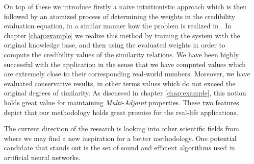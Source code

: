 \documentclass[egilmezThesis.tex]{subfiles}
\begin{document}
On top of these we introduce firstly a naive intuitionistic approach which is then followed by an atomized process of determining the weights in the credibility evaluation equation, in a similar manner how the problem is realized in \cite{MPS10}. In chapter \ref{chap:example} we realize this method by training the system with the original knowledge base, and then using the evaluated weights in order to compute the credibility values of the similarity relations. We have been highly successful with the application in the sense that we have computed values which are extremely close to their corresponding real-world numbers. Moreover, we have evaluated conservative results, in other terms values which do not exceed the original degrees of similarity. As discussed in chapter \ref{chap:example}, this notion holds great value for maintaining \textit{Multi-Adjoint} properties. These two features depict that our methodology holds great promise for the real-life applications.

The current direction of the research is looking into other scientific fields from where we may find a new inspiration for a better methodology. One potential candidate that stands out is the set of sound and efficient algorithms used in artificial neural networks. 
\end{document}
